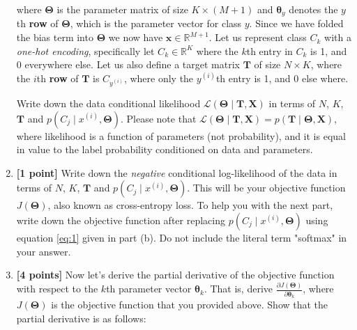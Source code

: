 \documentclass[11pt]{article}
\numberwithin{equation}{section} %
\numberwithin{figure}{section} %
\numberwithin{table}{section} %
\newcommand{\Rb}{\mathbb{R}}
\newcommand{\xv}{\mathbf{x}}
\newcommand{\Tv}{\mathbf{T}}
\newcommand{\Xv}{\mathbf{X}}
\newcommand{\thetav     }{\boldsymbol \theta     }
\newcommand{\Thetav     }{\boldsymbol \Theta     }
\begin{document}
\begin{enumerate}[label=(\alph*)]
    where $\Thetav$ is the parameter matrix of size $K \times (M + 1)$ and $\thetav_y$ denotes the $y$th \textbf{row} of $\Thetav$, which is the parameter vector for class $y$. Since we have folded the bias term into $\Thetav$ we now have $\xv \in \Rb^{M + 1}$. Let us represent class $C_k$ with a \emph{one-hot encoding}, specifically let $C_k \in \Rb^K$ where the $k$th entry in $C_k$ is 1, and 0 everywhere else. Let us also define a target matrix $\Tv$ of size $N \times K$, where the $i$th {\bf row} of $\Tv$ is $C_{y^{(i)}}$, where only the  $y^{(i)}$th entry is 1, and 0 else where.
    
    Write down the data conditional likelihood $ \mathcal{L}(\Thetav \mid \Tv, \Xv)$ in terms of $N$, $K$, $\Tv$ and $p\left(C_j \mid x^{(i)}, \Thetav \right)$. Please note that $\mathcal{L}(\Thetav \mid \Tv, \Xv) = p(\Tv \mid \Thetav, \Xv)$, where likelihood is a function of parameters (not probability), and it is equal in value to the label probability conditioned on data and parameters.
    
    \begin{solution}
    \bigskip \bigskip \bigskip \bigskip \bigskip \bigskip \bigskip \bigskip
    \bigskip \bigskip \bigskip \bigskip \bigskip \bigskip \bigskip \bigskip
    \end{solution}
    
    
    \item {\bf [1 point]} Write down the \emph{negative} conditional log-likelihood of the data in terms of $N$, $K$, $\Tv$ and $p\left(C_j \mid x^{(i)}, \Thetav \right)$. This will be your objective function $J(\Thetav)$, also known as cross-entropy loss. To help you with the next part, write down the objective function after replacing $p\left(C_j \mid x^{(i)}, \Thetav \right)$ using equation \ref{eq:1} given in part (b). Do not include the literal term "softmax" in your answer.
    
     \begin{solution}
    \bigskip \bigskip \bigskip \bigskip \bigskip \bigskip \bigskip \bigskip
    \bigskip \bigskip \bigskip \bigskip \bigskip \bigskip \bigskip \bigskip
    \end{solution}
    
    \clearpage
    
    \item {\bf [4 points]} Now let's derive the partial derivative of the objective function with respect to the $k$th parameter vector $\thetav_k$. That is, derive $\frac{ \partial J(\Thetav) }{ \partial \thetav_k}$, where $J(\Thetav)$ is the objective function that you provided above. Show that the partial derivative  is as follows:


\end{enumerate}
\end{document}
